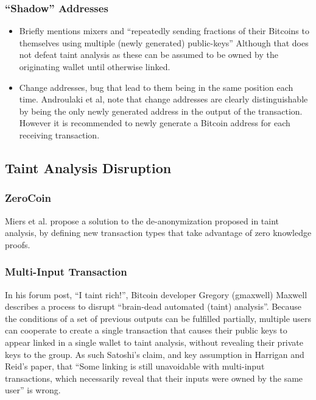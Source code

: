 \subsubsection{``Shadow'' Addresses}


\begin{itemize} \item Briefly mentions mixers and ``repeatedly sending fractions
        of their Bitcoins to themselves using multiple (newly generated)
    public-keys'' Although that does not defeat taint analysis as these can be
assumed to be owned by the originating wallet until otherwise linked.  \item
    Change addresses, bug that lead to them being in the same position each
    time.  Androulaki et al, note that change addresses are clearly
    distinguishable by being the only newly generated address in the output of
    the transaction.  However it is recommended to newly generate a Bitcoin
    address for each receiving transaction.  \end{itemize}

\subsection{Taint Analysis Disruption}

\subsubsection{ZeroCoin} Miers et al.
propose a solution to the de-anonymization proposed in taint analysis, by
defining new transaction types that take advantage of zero knowledge
proofs\cite{zerocoin}.  \subsubsection{Multi-Input Transaction}

In his forum post, ``I taint rich!'', Bitcoin developer Gregory (gmaxwell)
Maxwell describes a process to disrupt ``brain-dead automated (taint)
analysis''.  Because the conditions of a set of previous outputs can be
fulfilled partially, multiple users can cooperate to create a single transaction
that causes their public keys to appear linked in a single wallet to taint
analysis, without revealing their private keys to the group.  As such Satoshi’s
claim, and key assumption in Harrigan and Reid’s paper, that ``Some linking is
still unavoidable with multi-input transactions, which necessarily reveal that
their inputs were owned by the same user'' is wrong\cite{satoshi}.

